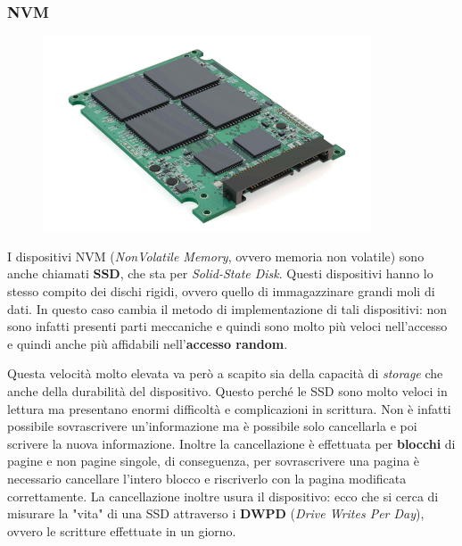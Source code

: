 % 
\subsubsection{NVM}\label{NVM}
\begin{figure}
  \includegraphics[width = \linewidth]{../res/imgs/mass memory/NVM.png}
  \label{fig:NVM}
\end{figure}
I dispositivi NVM (\textit{NonVolatile Memory}, ovvero memoria non volatile) sono anche chiamati \textbf{SSD}, che sta per \textit{Solid-State Disk}. Questi dispositivi hanno lo stesso compito dei dischi rigidi, ovvero quello di immagazzinare grandi moli di dati. In questo caso cambia il metodo di implementazione di tali dispositivi: non sono infatti presenti parti meccaniche e quindi sono molto più veloci nell'accesso e quindi anche più affidabili nell'\textbf{accesso random}.

Questa velocità molto elevata va però a scapito sia della capacità di \textit{storage} che anche della durabilità del dispositivo. Questo perché le SSD sono molto veloci in lettura ma presentano enormi difficoltà e complicazioni in scrittura. Non è infatti possibile sovrascrivere un'informazione ma è possibile solo cancellarla e poi scrivere la nuova informazione. Inoltre la cancellazione è effettuata per \textbf{blocchi} di pagine e non pagine singole, di conseguenza, per sovrascrivere una pagina è necessario cancellare l'intero blocco e riscriverlo con la pagina modificata correttamente. La cancellazione inoltre usura il dispositivo: ecco che si cerca di misurare la "vita" di una SSD attraverso i \textbf{DWPD} (\textit{Drive Writes Per Day}), ovvero le scritture effettuate in un giorno.

